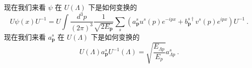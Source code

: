 现在我们来看 $\psi$ 在 $U(\Lambda)$ 下是如何变换的
\begin{equation}
U \psi(x) U^{-1} = U \int \frac{d^3p}{(2\pi)^3} \frac{1}{\sqrt{2 E_{\mathbf p}}} \sum_s (a_{\mathbf p}^s u^s(p) e^{-ipx}+b_{\mathbf p}^{s\dagger}v^s(p)e^{ipx})U^{-1}~.
\end{equation}
现在我们来看 $a^s_{\mathbf p}$ 在 $U(\Lambda)$ 下是如何变换的
\begin{equation}
U(\Lambda)a^s_{\mathbf p} U^{-1}(\Lambda) = \sqrt{\frac{E_{\Lambda p}}{E_{p}}} a_{\Lambda p }^s~.
\end{equation}





















